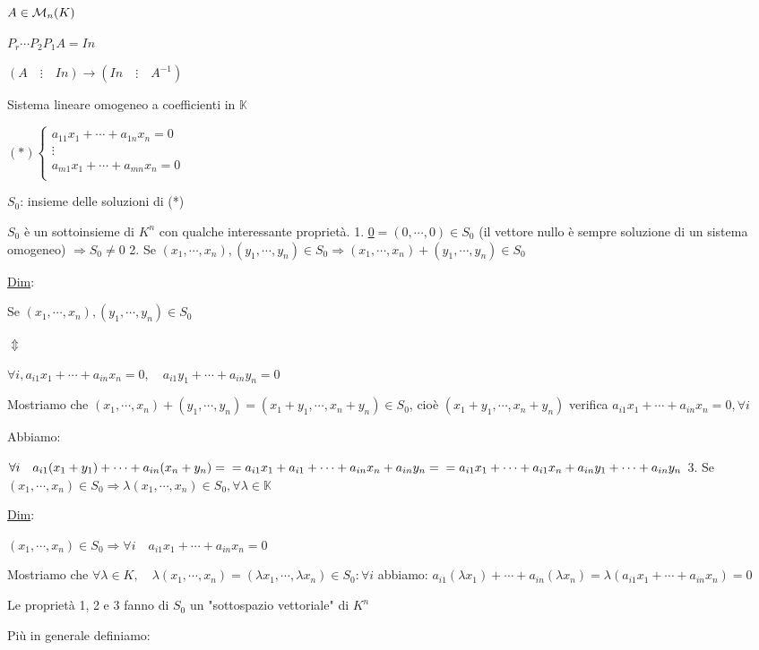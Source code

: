 \documentclass{article}
\begin{document}
$A\in \mathcal{M}_n(K)$

$P_r\cdots P_2P_1A=In$

$(A\quad\vdots\quad In)\rightarrow(In\quad\vdots\quad A^{-1})$

Sistema lineare omogeneo a coefficienti in $\mathbb{K}$

$(*)\begin{cases}
  a_{11}x_1+\cdots+a_{1n}x_n=0\\
  \vdots\\
  a_{m1}x_1+\cdots+a_{mn}x_n=0\\
\end{cases}$

$S_0$: insieme delle soluzioni di (*)

$S_0$ è un sottoinsieme di $K^n$ con qualche interessante proprietà.
1. \ul{0}$=(0,\cdots,0)\in S_0$ (il vettore nullo è sempre soluzione di un sistema omogeneo) $\Rightarrow S_0\not=0$
2. Se $(x_1,\cdots,x_n),(y_1,\cdots,y_n)\in S_0\Rightarrow(x_1,\cdots,x_n)+(y_1,\cdots,y_n)\in S_0$

   \ul{Dim}:

   Se $(x_1,\cdots,x_n),(y_1,\cdots,y_n)\in S_0$

   $\Updownarrow$

   $\forall i,a_{i1}x_1+\cdots+a_{in}x_n=0,\quad a_{i1}y_1+\cdots+a_{in}y_n=0$

   Mostriamo che $(x_1,\cdots,x_n)+(y_1,\cdots,y_n)=(x_1+y_1,\cdots,x_n+y_n)\in S_0$, cioè $(x_1+y_1,\cdots,x_n+y_n)$ verifica $a_{i1}x_1+\cdots+a_{in}x_n=0,\forall i$

   Abbiamo:

    $\forall i\quad a_{i1}(x_1+y_1)+\cdots+a_{in}(x_n+y_n)=\\=a_{i1}x_1+a_{i1}+\cdots+a_{in}x_n+a_{in}y_n=\\=a_{i1}x_1+\cdots+a_{i1}x_n+a_{in}y_1+\cdots+a_{in}y_n$
3. Se $(x_1,\cdots,x_n)\in S_0\Rightarrow\lambda(x_1,\cdots,x_n)\in S_0,\forall\lambda\in\mathbb{K}$

   \ul{Dim}:

   $(x_1,\cdots,x_n)\in S_0\Rightarrow\forall i\quad a_{i1}x_1+\cdots+a_{in}x_n=0$

   Mostriamo che $\forall\lambda\in K,\quad\lambda(x_1,\cdots,x_n)=(\lambda x_1,\cdots,\lambda x_n)\in S_0:\forall i$ abbiamo: $a_{i1}(\lambda x_1)+\cdots+a_{in}(\lambda x_n)=\lambda(a_{i1}x_1+\cdots+a_{in}x_n)=0$

Le proprietà 1, 2 e 3 fanno di $S_0$ un "sottospazio vettoriale" di $K^n$

Più in generale definiamo:
\end{document}
